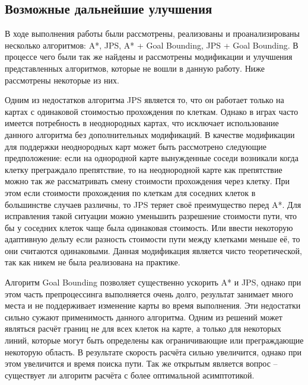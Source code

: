 \subsection{Возможные дальнейшие улучшения}

В ходе выполнения работы были рассмотрены, реализованы и проанализированы несколько алгоритмов: A*, JPS, A* + Goal Bounding, JPS + Goal Bounding. В процессе чего были так же найдены и рассмотрены модификации и улучшения представленных алгоритмов, которые не вошли в данную работу. Ниже рассмотрены некоторые из них.

Одним из недостатков алгоритма JPS является то, что он работает только на картах с одинаковой стоимостью прохождения по клеткам. Однако в играх часто имеется потребность в неоднородных картах, что исключает использование данного алгоритма без дополнительных модификаций. В качестве модификации для поддержки неоднородных карт может быть рассмотрено следующие предположение: если на однородной карте вынужденные соседи возникали когда клетку преграждало препятствие, то на неоднородной карте как препятствие можно так же рассматривать смену стоимости прохождения через клетку. При этом если стоимости прохождения по клеткам для соседних клеток в большинстве случаев различны, то JPS теряет своё преимущество перед A*. Для исправления такой ситуации можно уменьшить разрешение стоимости пути, что бы у соседних клеток чаще была одинаковая стоимость. Или ввести некоторую адаптивную дельту если разность стоимости пути между клетками меньше её, то они считаются одинаковыми. Данная модификация является чисто теоретической, так как никем не была реализована на практике.

Алгоритм Goal Bounding позволяет существенно ускорить A* и JPS, однако при этом часть препроцессинга выполняется очень долго, результат занимает много места и не поддерживает изменение карты во время выполнения. Эти недостатки сильно сужают применимость данного алгоритма. Одним из решений может являться расчёт границ не для всех клеток на карте, а только для некоторых линий, которые могут быть определены как ограничивающие или преграждающие некоторую область. В результате скорость расчёта сильно увеличится, однако при этом увеличится и время поиска пути. Так же открытым является вопрос -- существует ли алгоритм расчёта с более оптимальной асимптотикой.

